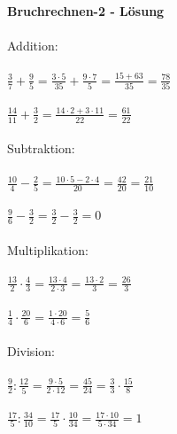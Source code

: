 


	\textbf{Bruchrechnen-2 - Lösung}\\\\
	Addition:\\\\
	$\frac{3}{7}+\frac{9}{5}=\frac{3\cdot5}{35}+\frac{9\cdot7}{5}=\frac{15+63}{35}=\frac{78}{35}$\\\\
	$\frac{14}{11}+\frac{3}{2}=\frac{14\cdot2+3\cdot11}{22}=\frac{61}{22}$\\\\
	Subtraktion:\\\\
	$\frac{10}{4}-\frac{2}{5}=\frac{10\cdot5-2\cdot4}{20}=\frac{42}{20}=\frac{21}{10}$\\\\
	$\frac{9}{6}-\frac{3}{2}=\frac{3}{2}-\frac{3}{2}=0$\\\\
	Multiplikation:\\\\
	$\frac{13}{2}\cdot\frac{4}{3}=\frac{13\cdot4}{2\cdot3}=\frac{13\cdot2}{3}=\frac{26}{3}$\\\\
	$\frac{1}{4}\cdot\frac{20}{6}=\frac{1\cdot20}{4\cdot6}=\frac{5}{6}$\\\\
	Division:\\\\
	$\frac{9}{2}:\frac{12}{5}=\frac{9\cdot5}{2\cdot12}=\frac{45}{24}=\frac{3}{3}\cdot\frac{15}{8}$\\\\
	$\frac{17}{5}:\frac{34}{10}=\frac{17}{5}\cdot\frac{10}{34}=\frac{17\cdot10}{5\cdot34}=1$\\\\

